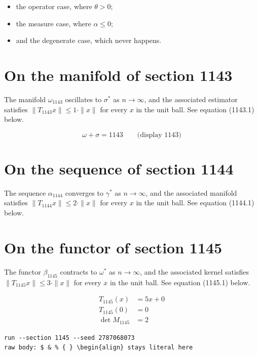\documentclass{article}
\begin{document}
\begin{itemize}
  \item the operator case, where $\theta > 0$;
  \item the measure case, where $\alpha \leq 0$;
  \item and the degenerate case, which never happens.
\end{itemize}

\section{On the manifold of section 1143}
The manifold $\omega_{1143}$ oscillates to $\sigma^{*}$ as $n \to \infty$,
and the associated estimator satisfies $\|T_{1143} x\| \leq 1 \cdot \|x\|$
for every $x$ in the unit ball. See equation (1143.1) below.

$$
\omega + \sigma = 1143 \qquad \text{(display 1143)}
$$

\section{On the sequence of section 1144}
The sequence $\alpha_{1144}$ converges to $\gamma^{*}$ as $n \to \infty$,
and the associated manifold satisfies $\|T_{1144} x\| \leq 2 \cdot \|x\|$
for every $x$ in the unit ball. See equation (1144.1) below.

\section{On the functor of section 1145}
The functor $\beta_{1145}$ contracts to $\omega^{*}$ as $n \to \infty$,
and the associated kernel satisfies $\|T_{1145} x\| \leq 3 \cdot \|x\|$
for every $x$ in the unit ball. See equation (1145.1) below.

\begin{align}
T_{1145}(x) &= 5 x + 0 \\
T_{1145}(0) &= 0 \\
\det M_{1145} &= 2
\end{align}

\begin{verbatim}
run --section 1145 --seed 2787068073
raw body: $ & % { } \begin{align} stays literal here
\end{verbatim}
\end{document}
